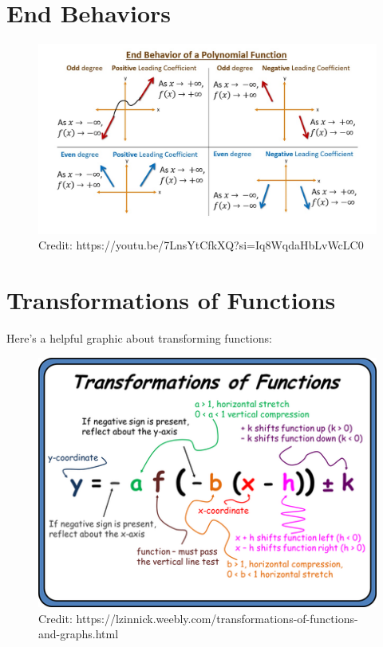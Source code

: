 \documentclass[12pt]{article}
\begin{document}
\section{End Behaviors}

\begin{figure}[H]
	\centering
	\includegraphics[scale=0.4]{maxresdefault.jpg}
	\caption{Credit: https://youtu.be/7LnsYtCfkXQ?si=Iq8WqdaHbLvWcLC0}
\end{figure}

\section{Transformations of Functions}

Here's a helpful graphic about transforming functions:

\begin{figure}[H]
	\centering
	\includegraphics[scale=0.5]{9546920.png}
	\caption{Credit: https://lzinnick.weebly.com/transformations-of-functions-and-graphs.html}
\end{figure}
\end{document}
